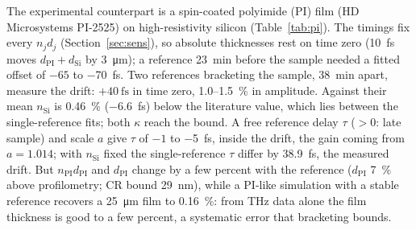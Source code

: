 \documentclass{optica-article}
\newcommand{\kap}{\kappa}
\newcommand{\nS}{n_{\mathrm{Si}}}\newcommand{\kS}{\kap_{\mathrm{Si}}}\newcommand{\dS}{d_{\mathrm{Si}}}
\begin{document}
The experimental counterpart is a spin-coated polyimide (PI) film (HD Microsystems PI-2525) on high-resistivity silicon  (Table~\ref{tab:pi}). The timings fix every $n_jd_j$ (Section~\ref{sec:sens}), so absolute thicknesses rest on time zero (\SI{10}{\femto\second} moves $d_{\mathrm{PI}}+\dS$ by \SI{3}{\micro\metre}); a reference \SI{23}{\minute} before the sample needed a fitted offset of $-65$ to \SI{-70}{\femto\second}. Two references bracketing the sample, \SI{38}{\minute} apart, measure the drift: $+\SI{40}{\femto\second}$ in time zero, 1.0--\SI{1.5}{\percent} in amplitude. Against their mean $\nS$ is \SI{0.46}{\percent} (\SI{-6.6}{\femto\second}) below the literature value, which lies between the single-reference fits; both $\kap$ reach the bound. A free reference delay $\tau$ (${>}0$: late sample) and scale $a$ give $\tau$ of $-1$ to \SI{-5}{\femto\second}, inside the drift, the gain coming from $a=1.014$; with $\nS$ fixed the single-reference $\tau$ differ by \SI{38.9}{\femto\second}, the measured drift. But $n_{\mathrm{PI}}d_{\mathrm{PI}}$ and $d_{\mathrm{PI}}$ change by a few percent with the reference ($d_{\mathrm{PI}}$ \SI{7}{\percent} above profilometry; CR bound \SI{29}{\nano\metre}), while a PI-like simulation with a stable reference recovers a \SI{25}{\micro\metre} film to \SI{0.16}{\percent}: from THz data alone the film thickness is good to a few percent, a systematic error that bracketing bounds.
\end{document}
